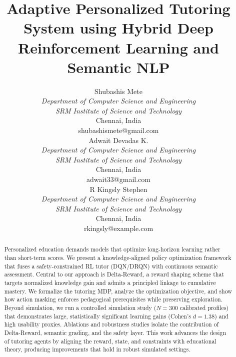\documentclass[conference]{IEEEtran}
\begin{document}
\title{Adaptive Personalized Tutoring System using Hybrid Deep Reinforcement Learning and Semantic NLP}

\author{
\begin{minipage}[t]{0.30\textwidth}\centering
Shubashis Mete\\
\textit{Department of Computer Science and Engineering}\\
\textit{SRM Institute of Science and Technology}\\
Chennai, India\\
shubashismete@gmail.com
\end{minipage}\hfill
\begin{minipage}[t]{0.30\textwidth}\centering
Adwait Devadas K.\\
\textit{Department of Computer Science and Engineering}\\
\textit{SRM Institute of Science and Technology}\\
Chennai, India\\
adwait33@gmail.com
\end{minipage}\hfill
\begin{minipage}[t]{0.30\textwidth}\centering
R Kingsly Stephen\\
\textit{Department of Computer Science and Engineering}\\
\textit{SRM Institute of Science and Technology}\\
Chennai, India\\
rkingsly@example.com
\end{minipage}
}

\maketitle

\begin{abstract}
Personalized education demands models that optimize long-horizon learning rather than short-term scores. We present a knowledge-aligned policy optimization framework that fuses a safety-constrained RL tutor (DQN/DRQN) with continuous semantic assessment. Central to our approach is Delta-Reward, a reward shaping scheme that targets normalized knowledge gain and admits a principled linkage to cumulative mastery. We formalize the tutoring MDP, analyze the optimization objective, and show how action masking enforces pedagogical prerequisites while preserving exploration. Beyond simulation, we run a controlled simulation study ($N=300$ calibrated profiles) that demonstrates large, statistically significant learning gains (Cohen’s $d=1.38$) and high usability proxies. Ablations and robustness studies isolate the contribution of Delta-Reward, semantic grading, and the safety layer. This work advances the design of tutoring agents by aligning the reward, state, and constraints with educational theory, producing improvements that hold in robust simulated settings.
\end{abstract}
\end{document}

